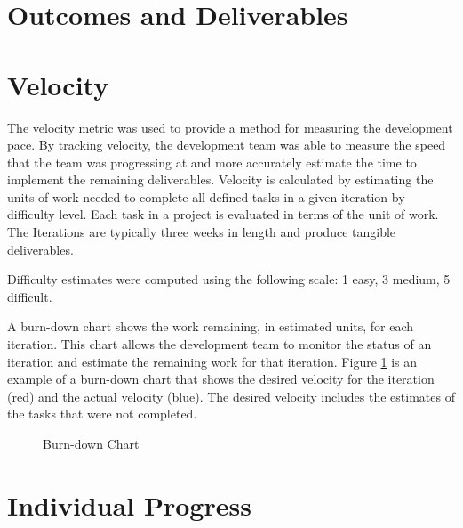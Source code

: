 \documentclass[12pt]{elsarticle}
\begin{document}
\section{Outcomes and Deliverables}

\clearpage


\section{Velocity}

The velocity metric was used to provide a method for measuring the development pace. By tracking velocity, the development team was able to measure the speed that the team was progressing at and more accurately estimate the time to implement the remaining deliverables. Velocity is calculated by estimating the units of work needed to complete all defined tasks in a given iteration by difficulty level. Each task in a project is evaluated in terms of the unit of work. The Iterations are typically three weeks in length and produce tangible deliverables.

Difficulty estimates were computed using the following scale: 1 easy, 3 medium, 5 difficult.

A burn-down chart shows the work remaining, in estimated units, for each iteration. This chart allows the development team to monitor the status of an iteration and estimate the remaining work for that iteration. Figure \ref{burndown} is an example of a burn-down chart that shows the desired velocity for the iteration (red) and the actual velocity (blue). The desired velocity includes the estimates of the tasks that were not completed.

\begin{figure}[!ht]
	\centering
\caption{Burn-down Chart}
\label{burndown}
\end{figure}

\section{Individual Progress}
\end{document}
